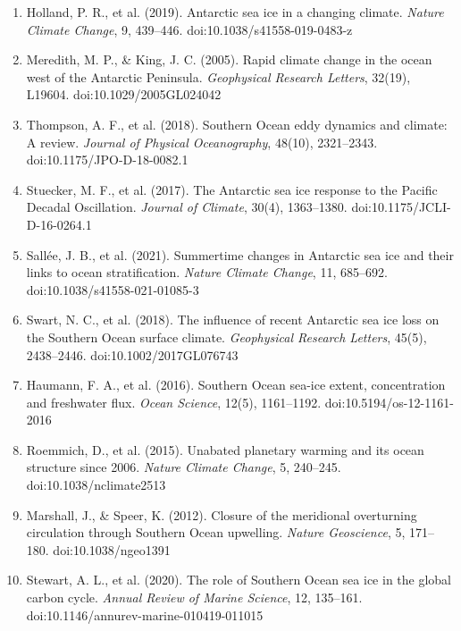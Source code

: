 \documentclass[11pt,a4paper]{article}
\begin{document}
\begin{enumerate}[leftmargin=*,itemsep=2pt,topsep=0pt]
\item Holland, P. R., et al. (2019). Antarctic sea ice in a changing climate. \textit{Nature Climate Change}, 9, 439--446. doi:10.1038/s41558-019-0483-z

\item Meredith, M. P., \& King, J. C. (2005). Rapid climate change in the ocean west of the Antarctic Peninsula. \textit{Geophysical Research Letters}, 32(19), L19604. doi:10.1029/2005GL024042

\item Thompson, A. F., et al. (2018). Southern Ocean eddy dynamics and climate: A review. \textit{Journal of Physical Oceanography}, 48(10), 2321--2343. doi:10.1175/JPO-D-18-0082.1

\item Stuecker, M. F., et al. (2017). The Antarctic sea ice response to the Pacific Decadal Oscillation. \textit{Journal of Climate}, 30(4), 1363--1380. doi:10.1175/JCLI-D-16-0264.1

\item Sallée, J. B., et al. (2021). Summertime changes in Antarctic sea ice and their links to ocean stratification. \textit{Nature Climate Change}, 11, 685--692. doi:10.1038/s41558-021-01085-3

\item Swart, N. C., et al. (2018). The influence of recent Antarctic sea ice loss on the Southern Ocean surface climate. \textit{Geophysical Research Letters}, 45(5), 2438--2446. doi:10.1002/2017GL076743

\item Haumann, F. A., et al. (2016). Southern Ocean sea-ice extent, concentration and freshwater flux. \textit{Ocean Science}, 12(5), 1161--1192. doi:10.5194/os-12-1161-2016

\item Roemmich, D., et al. (2015). Unabated planetary warming and its ocean structure since 2006. \textit{Nature Climate Change}, 5, 240--245. doi:10.1038/nclimate2513

\item Marshall, J., \& Speer, K. (2012). Closure of the meridional overturning circulation through Southern Ocean upwelling. \textit{Nature Geoscience}, 5, 171--180. doi:10.1038/ngeo1391

\item Stewart, A. L., et al. (2020). The role of Southern Ocean sea ice in the global carbon cycle. \textit{Annual Review of Marine Science}, 12, 135--161. doi:10.1146/annurev-marine-010419-011015


\end{enumerate}
\end{document}
